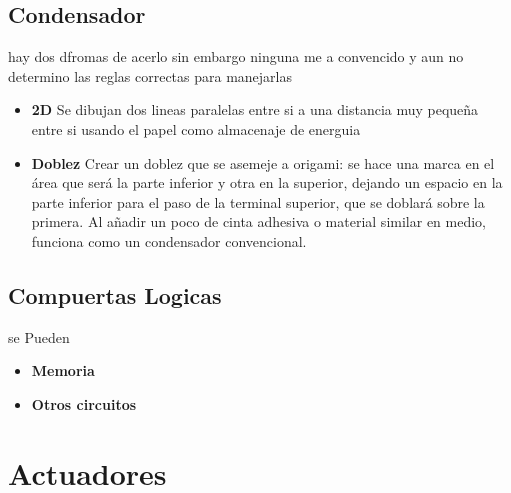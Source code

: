 \documentclass[]{article}
\begin{document}
\subsection{Condensador}
hay dos dfromas de acerlo sin embargo ninguna me a convencido
y aun no determino las reglas correctas para manejarlas
\begin{itemize}
    \item \textbf{2D}
    Se dibujan dos lineas paralelas entre si a una distancia muy
    pequeña entre si usando el papel como almacenaje de energuia
    \item \textbf{Doblez}
    Crear un doblez que se asemeje a origami: se hace una marca en el área que será la parte
    inferior y otra en la superior, dejando un espacio en la parte inferior para el paso de la
    terminal superior, que se doblará sobre la primera. Al añadir un poco de cinta adhesiva o
    material similar en medio, funciona como un condensador convencional.
\end{itemize}
\subsection{Compuertas Logicas}
se Pueden
\begin{itemize}
    \item \textbf{Memoria}
    \item \textbf{Otros circuitos}
\end{itemize}

\section{Actuadores}
\end{document}
